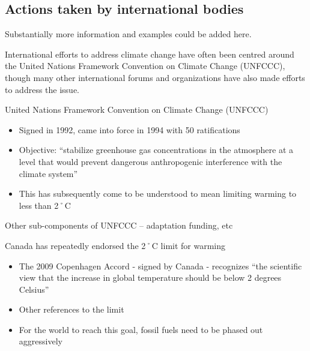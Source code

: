 

		\subsection{Actions taken by international bodies}
		
\begin{vcom}
	Substantially more information and examples could be added here.
\end{vcom}

International efforts to address climate change have often been centred around the United Nations Framework Convention on Climate Change (UNFCCC), though many other international forums and organizations have also made efforts to address the issue.

United Nations Framework Convention on Climate Change (UNFCCC)
\begin{itemize}
	\item Signed in 1992, came into force in 1994 with 50 ratifications
	\item Objective: ``stabilize greenhouse gas concentrations in the atmosphere at a level that would prevent dangerous anthropogenic interference with the climate system''
	\item This has subsequently come to be understood to mean limiting warming to less than 2˚C
\end{itemize}
	

\begin{vcom}
	Other sub-components of UNFCCC – adaptation funding, etc
\end{vcom}	






Canada has repeatedly endorsed the 2˚C limit for warming
\begin{itemize}
	\item The 2009 Copenhagen Accord - signed by Canada - recognizes ``the scientific view that the increase in global temperature should be below 2 degrees Celsius''
	\item \textsf{Other references to the limit}
	\item For the world to reach this goal, fossil fuels need to be phased out aggressively
\end{itemize}
	
